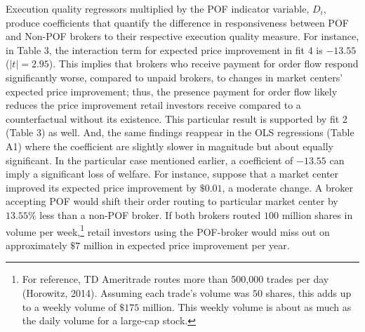 \documentclass[12pt,a4paper]{article}
\begin{document}
Execution quality regressors multiplied by the POF indicator variable, $D_i$, produce coefficients that quantify the difference in responsiveness between POF and Non-POF brokers to their respective execution quality measure. For instance, in Table 3, the interaction term for expected price improvement in fit 4 is $-13.55$ ($|t| = 2.95$). This implies that brokers who receive payment for order flow respond significantly worse, compared to unpaid brokers, to changes in market centers' expected price improvement; thus, the presence payment for order flow likely reduces the price improvement retail investors receive compared to a counterfactual without its existence. This particular result is supported by fit 2 (Table 3) as well. And, the same findings reappear in the OLS regressions (Table A1) where the coefficient are slightly slower in magnitude but about equally significant. In the particular case mentioned earlier, a coefficient of $-13.55$ can imply a significant loss of welfare. For instance, suppose that a market center improved its expected price improvement by $\$0.01$, a moderate change. A broker accepting POF would shift their order routing to particular market center by $13.55\%$ less than a non-POF broker. If both brokers routed $100$ million shares in volume per week,\footnote{ For reference, TD Ameritrade routes more than 500,000 trades per day (Horowitz, 2014). Assuming each trade's volume was $50$ shares, this adds up to a weekly volume of $\$175$ million. This weekly volume is about as much as the daily volume for a large-cap stock.}  retail investors using the POF-broker would miss out on approximately $\$7$ million in expected price improvement per year.
\end{document}
